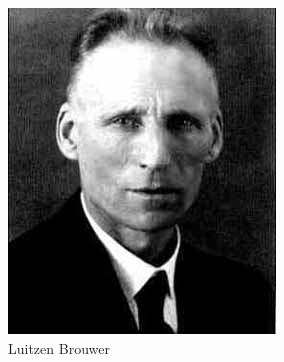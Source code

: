 \documentclass[xetex]{beamer}
\begin{document}
\begin{frame}
\begin{figure}
\centering
\begin{minipage}{.3\textwidth}
\centering
\includegraphics[width=\linewidth]{brouwer}
\caption*{Luitzen Brouwer}
\label{fig:test1}
\end{minipage}\hfill
\begin{minipage}{.3\textwidth}
\centering

\end{minipage}
\end{figure}
\end{frame}
\end{document}
